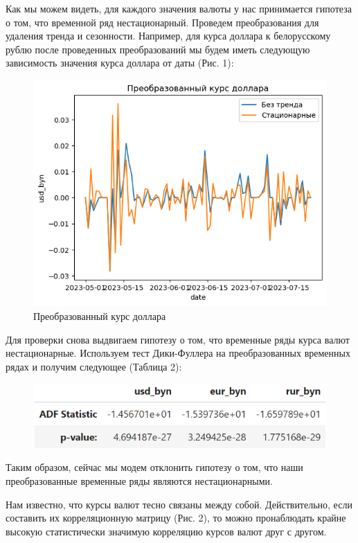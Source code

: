 \documentclass[a4paper, 14pt]{extarticle}
\begin{document}
	Как мы можем видеть, для каждого значения валюты у нас принимается гипотеза о том, что временной ряд нестационарный. Проведем преобразования для удаления тренда и сезонности. Например, для курса доллара к белорусскому рублю после проведенных преобразований мы будем иметь следующую зависимость значения курса доллара от даты (Рис. 1):
	
	\begin{figure}[h!]
		\centering
		\includegraphics[scale=1.0]{images/pic_01}
		\caption[Рис. 1]{Преобразованный курс доллара}
		\label{fig:pic01}
	\end{figure}
	
	Для проверки снова выдвигаем гипотезу о том, что временные ряды курса валют нестационарные. Используем тест Дики-Фуллера на преобразованных временных рядах и получим следующее (Таблица 2):
	
	\begin{figure}[h!]
		\centering
		\label{fig:tab2}
		\includegraphics[scale=1.3]{images/tab_2}
	\end{figure}
	
	Таким образом, сейчас мы модем отклонить гипотезу о том, что наши преобразованные временные ряды являются нестационарными.
	
	Нам известно, что курсы валют тесно связаны между собой. Действительно, если составить их корреляционную матрицу (Рис. 2), то можно пронаблюдать крайне высокую статистически значимую корреляцию курсов валют друг с другом.
	
\end{document}
